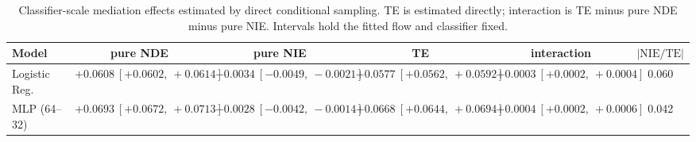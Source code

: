 \begin{table}[htbp]
  \centering
  \caption{Classifier-scale mediation effects estimated by direct conditional sampling. TE is estimated directly; interaction is TE minus pure NDE minus pure NIE. Intervals hold the fitted flow and classifier fixed.}
  \label{tab:oulad_gap_overall}
  \begin{tabular}{lccccc}
    \toprule
    Model & pure NDE & pure NIE & TE & interaction & $|\mathrm{NIE}/\mathrm{TE}|$ \\
    \midrule
    Logistic Reg. & $+0.0608\ [+0.0602,\ +0.0614]$ & $-0.0034\ [-0.0049,\ -0.0021]$ & $+0.0577\ [+0.0562,\ +0.0592]$ & $+0.0003\ [+0.0002,\ +0.0004]$ & 0.060 \\
    MLP (64--32) & $+0.0693\ [+0.0672,\ +0.0713]$ & $-0.0028\ [-0.0042,\ -0.0014]$ & $+0.0668\ [+0.0644,\ +0.0694]$ & $+0.0004\ [+0.0002,\ +0.0006]$ & 0.042 \\
    \bottomrule
  \end{tabular}
\end{table}